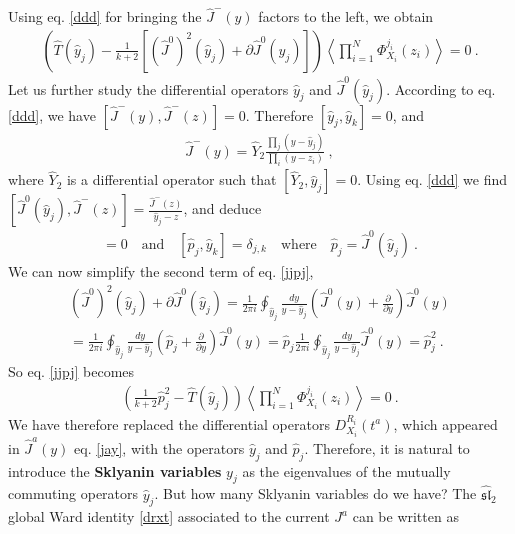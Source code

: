 \documentclass[12pt, a4paper, notitlepage, twoside]{report}
\numberwithin{equation}{section}
\theoremstyle{break}
\begin{document}
Using eq. \eqref{ddd} for bringing the $\hat{J}^-(y)$ factors to the left, we obtain
\begin{align}
 \left( \hat{T}(\hat{y}_j) -\frac{1}{k+2}\left[(\hat{J}^0)^2(\hat{y}_j) + \partial \hat{J}^0(\hat{y}_j)\right] \right)  \left\langle \prod_{i=1}^N \Phi^{j_i}_{X_i}(z_i)\right\rangle= 0 \ .
\label{jjpj}
\end{align}
Let us further study the differential operators $\hat{y}_j$ and $\hat{J}^0(\hat{y}_j)$.
According to eq. \eqref{ddd}, we have $[\hat{J}^-(y),\hat{J}^-(z)]=0$.
Therefore $[\hat{y}_j,\hat{y}_k]=0$, and
\begin{align}
 \boxed{\hat{J}^-(y)  = \hat{Y}_2 \frac{\prod_{j}(y-\hat{y}_j)}{\prod_i(y-z_i)}}\ ,
\label{djm}
\end{align}
where $\hat{Y}_2$ is a differential operator such that $[\hat{Y}_2,\hat{y}_j]=0$.
Using eq. \eqref{ddd} we find $[\hat{J}^0(\hat{y}_j),\hat{J}^-(z)] = \frac{\hat{J}^-(z)}{\hat{y}_j-z}$, and deduce
\begin{align}
 [\hat{p}_j,\hat{Y}_2]=0 \quad \text{and} \quad [\hat{p}_j,\hat{y}_k]=\delta_{j,k} \quad \text{where} \quad \hat{p}_j = \hat{J}^0(\hat{y}_j)\ .
\label{pyd}
\end{align}
We can now simplify the second term of eq. \eqref{jjpj},
\begin{multline}
 (\hat{J}^0)^2(\hat{y}_j) + \partial \hat{J}^0(\hat{y}_j) = \frac{1}{2\pi i} \oint_{\hat{y}_j} \frac{dy}{y-\hat{y}_j}\left(\hat{J}^0(y) +{\frac{\partial}{\partial y}} \right) \hat{J}^0(y) \\
 = \frac{1}{2\pi i} \oint_{\hat{y}_j} \frac{dy}{y-\hat{y}_j}\left(\hat{p}_j +{\frac{\partial}{\partial y}} \right) \hat{J}^0(y)
 = \hat{p}_j \frac{1}{2\pi i} \oint_{\hat{y}_j} \frac{dy}{y-\hat{y}_j} \hat{J}^0(y) = \hat{p}_j^2\ .
\end{multline}
So eq. \eqref{jjpj} becomes 
\begin{align}
 \boxed{\left(\frac{1}{k+2}\hat{p}_j^2 -\hat{T}(\hat{y}_j)\right) \left\langle \prod_{i=1}^N \Phi^{j_i}_{X_i}(z_i)\right\rangle= 0 }\ .
\label{ppdz}
\end{align}
We have therefore replaced the differential operators $D^{R_i}_{X_i}(t^a)$, which appeared in $\hat{J}^a(y)$ eq. \eqref{jay}, with the operators $\hat{y}_j$ and $\hat{p}_j$.
Therefore, it is natural to introduce the
\textbf{\boldmath Sklyanin variables} $y_j$ as the eigenvalues of the mutually commuting operators $\hat{y}_j$. 
But how many Sklyanin variables do we have? 
The $\widehat{\mathfrak{sl}}_2$ global Ward identity \eqref{drxt} associated to the current $J^a$ can be written as 
\end{document}
